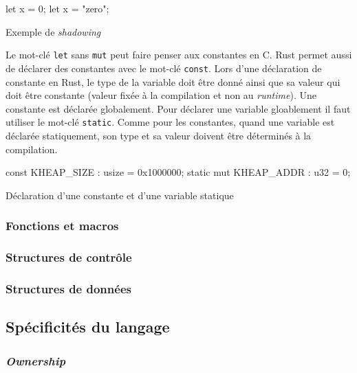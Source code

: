 \begin{code}
\begin{rustcode}
let x = 0;
let x = "zero";
\end{rustcode}
\caption{Exemple de \textit{shadowing}}
\label{lst:rust:var2}
\end{code} \bigbreak

Le mot-clé \texttt{let} sans \texttt{mut} peut faire penser
aux constantes en C. Rust permet aussi de déclarer des constantes avec le mot-clé
\texttt{const}. Lors d'une déclaration de constante en Rust, le type
de la variable doit être donné ainsi que sa valeur qui doit être constante (valeur
fixée à la compilation et non au \textit{runtime}). Une constante est déclarée
globalement. Pour déclarer une variable gloablement il faut utiliser le mot-clé
\texttt{static}. Comme pour les constantes, quand une variable est déclarée
statiquement, son type et sa valeur doivent être déterminés à la compilation.

\begin{code}
\begin{rustcode}
const KHEAP_SIZE        : usize = 0x1000000;
static mut KHEAP_ADDR   : u32   = 0;
\end{rustcode}
\caption{Déclaration d'une constante et d'une variable statique}
\label{lst:rust:var2}
\end{code} \bigbreak

\subsubsection{Fonctions et macros}

\subsubsection{Structures de contrôle}

\subsubsection{Structures de données}


\subsection{Spécificités du langage}
\subsubsection{\textit{Ownership}}


